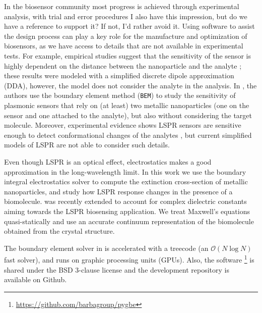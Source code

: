 In the biosensor community most progress is achieved 
through experimental analysis, with trial and error procedures {\color{blue} I also have this impression, but do we have a reference to support it? If not, I'd rather avoid it}. 
Using software to assist the design process can play a key role for the manufacture and optimization
of biosensors, as we have access to details that are not available in experimental tests.
For example, empirical studies suggest that the sensitivity of the sensor
is highly dependent on the distance between the nanoparticle and the analyte \cite{HaesETal2004};
these results were modeled with a simplified discrete dipole approximation (DDA), however, 
the model does not consider the analyte in the analysis. 
In \cite{BeuwervanHoofZijlstra2018,HenkelETal2018}, the authors use the boundary element method (\texttt{BEM}) to study the sensitivity of plasmonic sensors that rely on (at least) two metallic nanoparticles (one on the sensor and one attached to the analyte), but also without considering the target molecule.
Moreover, experimental evidence shows LSPR sensors are sensitive enough to detect conformational changes of the analytes \cite{HallETal2011}, 
but current simplified models of LSPR are not able to consider such details.


Even though LSPR is an optical effect, electrostatics 
makes a good approximation in the long-wavelength limit. In this work we use
the boundary integral electrostatics solver \pygbe \cite{CooperETal2016} 
to compute the extinction cross-section of metallic nanoparticles, and study how LSPR 
response changes in the presence
of a biomolecule. \pygbe was recently extended to account for complex dielectric constants 
\cite{ClementiETal2017} aiming towards the LSPR biosensing application. We treat Maxwell's
equations quasi-statically \cite{MayergoyzZhang2007} and
use an accurate continuum representation of the biomolecule obtained from the
crystal structure. 

The boundary element solver in \pygbe
is accelerated with a treecode (an $\mathcal{O}(N\log N)$ fast solver), and runs on
graphic processing units (GPUs). Also, the software
\footnote{\url{https://github.com/barbagroup/pygbe}} is shared under the 
BSD 3-clause license and the development repository is available on Github.





